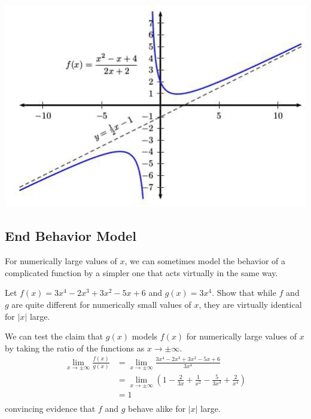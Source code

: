 \documentclass[12pt]{article}
\begin{document}
\begin{minipage}{0.33\textwidth}
    \begin{center}
        \includegraphics[scale=0.3]{Oblique asymptotes.jpeg}
    \end{center}
\end{minipage}


\subsection{End Behavior Model}
For numerically large values of $x$, we can sometimes model the behavior of a complicated function by a simpler one that acts virtually in the same way.

\begin{example}{Let $f(x) = 3x^4 - 2x^3 + 3x^2 - 5x + 6$ and $g(x) = 3x^4$. Show that while $f$ and $g$ are quite different for numerically small values of $x$, they are virtually identical for $|x|$ large.}
    
    We can test the claim that $g(x)$ models $f(x)$ for numerically large values of $x$ by taking the ratio of the functions as $x \to \pm \infty$. \\
    \begin{align*}
        \lim_{x \to \pm\infty} \frac{f(x)}{g(x)} &= \lim_{x \to \pm\infty} \frac{3x^4-2x^3+3x^2-5x+6}{3x^4} \\
        &= \lim_{x \to \pm\infty} \left( 1 - \frac{2}{3x} + \frac{1}{x^2} - \frac{5}{3x^3} + \frac{2}{x^4} \right)  \\
        &= 1 \\
    \end{align*}
    convincing evidence that $f$ and $g$ behave alike for $|x|$ large.
\end{example}
\end{document}
